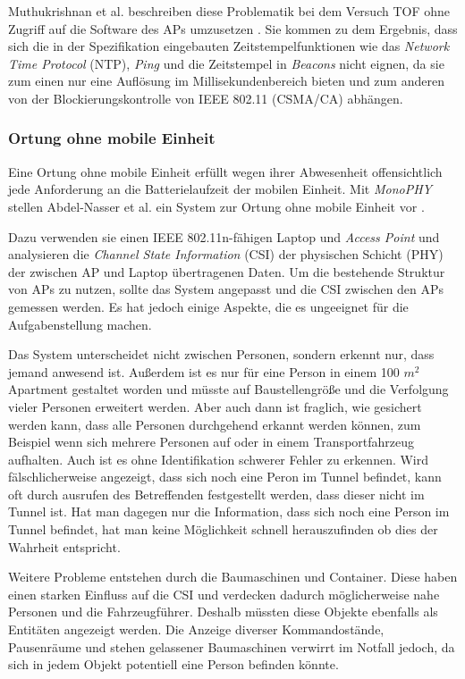 Muthukrishnan et al. beschreiben diese Problematik bei dem Versuch TOF ohne Zugriff auf die Software des APs umzusetzen \cite{muthukrishnan2006using}.
Sie kommen zu dem Ergebnis, dass sich die in der Spezifikation eingebauten Zeitstempelfunktionen wie das \emph{Network Time Protocol} (NTP), \emph{Ping} und die Zeitstempel in \emph{Beacons} nicht eignen, da sie zum einen nur eine Auflösung im Millisekundenbereich bieten und zum anderen von der Blockierungskontrolle von IEEE 802.11 (CSMA/CA) abhängen.

\subsubsection{Ortung ohne mobile Einheit}
\label{ch:Vorherige:sec:CSI}
Eine Ortung ohne mobile Einheit erfüllt wegen ihrer Abwesenheit offensichtlich jede Anforderung an die Batterielaufzeit der mobilen Einheit.
Mit \emph{MonoPHY} stellen Abdel-Nasser et al. ein System zur Ortung ohne mobile Einheit vor \cite{abdel2013monophy}. 

Dazu verwenden sie einen IEEE 802.11n-fähigen Laptop und \emph{Access Point} und analysieren die \emph{Channel State Information} (CSI) der physischen Schicht (PHY) der zwischen AP und Laptop übertragenen Daten.
Um die bestehende Struktur von APs zu nutzen, sollte das System angepasst und die CSI zwischen den APs gemessen werden.
Es hat jedoch einige Aspekte, die es ungeeignet für die Aufgabenstellung machen.

Das System unterscheidet nicht zwischen Personen, sondern erkennt nur, dass jemand anwesend ist. 
Außerdem ist es nur für eine Person in einem 100 $m^2$ Apartment gestaltet worden und müsste auf Baustellengröße und die Verfolgung vieler Personen erweitert werden.
Aber auch dann ist fraglich, wie gesichert werden kann, dass alle Personen durchgehend erkannt werden können, zum Beispiel wenn sich mehrere Personen auf oder in einem Transportfahrzeug aufhalten.
Auch ist es ohne Identifikation schwerer Fehler zu erkennen. 
Wird fälschlicherweise angezeigt, dass sich noch eine Peron im Tunnel befindet, kann oft durch ausrufen des Betreffenden festgestellt werden, dass dieser nicht im Tunnel ist. 
Hat man dagegen nur die Information, dass sich noch eine Person im Tunnel befindet, hat man keine Möglichkeit schnell herauszufinden ob dies der Wahrheit entspricht.

Weitere Probleme entstehen durch die Baumaschinen und Container. 
Diese haben einen starken Einfluss auf die CSI und verdecken dadurch möglicherweise nahe Personen und die Fahrzeugführer.
Deshalb müssten diese Objekte ebenfalls als Entitäten angezeigt werden. 
Die Anzeige diverser Kommandostände, Pausenräume und stehen gelassener Baumaschinen verwirrt im Notfall jedoch, da sich in jedem Objekt potentiell eine Person befinden könnte.

